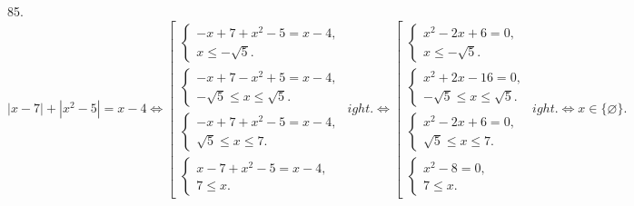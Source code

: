 85. $|x-7|+|x^2-5|=x-4\Leftrightarrow \left[\begin{array}{l}\begin{cases} -x+7+x^2-5=x-4,\\ x\leqslant -\sqrt{5}.\end{cases}\\
\begin{cases} -x+7-x^2+5=x-4,\\ -\sqrt{5}\leqslant x\leqslant \sqrt{5}.\end{cases}\\ \begin{cases} -x+7+x^2-5=x-4,\\ \sqrt{5}\leqslant x\leqslant7.\end{cases}\\
\begin{cases} x-7+x^2-5=x-4,\\ 7 \leqslant x.\end{cases}
\end{array}
ight.\Leftrightarrow
\left[\begin{array}{l}\begin{cases} x^2-2x+6=0,\\ x\leqslant -\sqrt{5}.\end{cases}\\
\begin{cases} x^2+2x-16=0,\\ -\sqrt{5}\leqslant x\leqslant \sqrt{5}.\end{cases}\\ \begin{cases} x^2-2x+6=0,\\ \sqrt{5}\leqslant x\leqslant7.\end{cases}\\
\begin{cases} x^2-8=0,\\ 7 \leqslant x.\end{cases}
\end{array}
ight.\Leftrightarrow x\in\{\varnothing\}.$\\

